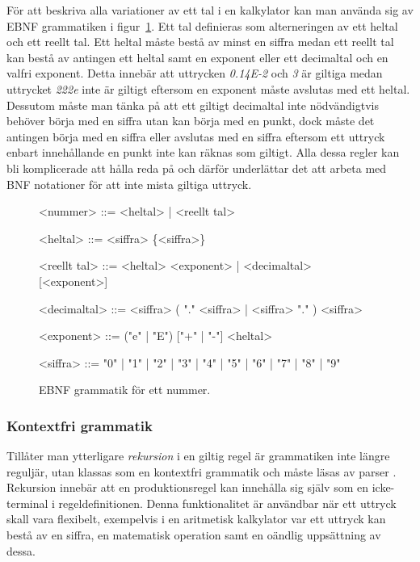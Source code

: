 För att beskriva alla variationer av ett tal i en kalkylator kan man
använda sig av EBNF grammatiken i figur~\ref{fig:reg}. Ett tal definieras som
alterneringen av ett heltal och ett reellt tal. Ett heltal måste bestå av
minst en siffra medan ett reellt tal kan bestå av antingen ett heltal samt en
exponent eller ett decimaltal och en valfri exponent. Detta innebär att
uttrycken \textit{0.14E-2} och \textit{3} är giltiga medan uttrycket
\textit{222e} inte är giltigt eftersom en exponent måste avslutas med ett
heltal. Dessutom måste man tänka på att ett giltigt decimaltal inte
nödvändigtvis behöver börja med en siffra utan kan börja med en punkt, dock
måste det antingen börja med en siffra eller avslutas med en siffra eftersom
ett uttryck enbart innehållande en punkt inte kan räknas som giltigt. Alla
dessa regler kan bli komplicerade att hålla reda på och därför underlättar det
att arbeta med BNF notationer för att inte mista giltiga uttryck.

\begin{figure}[ht]
  \begin{grammar}
    \singlespace\small%
    \selectfont

    <nummer> ::= <heltal> | <reellt tal>

    <heltal> ::= <siffra> \{<siffra>\}

    <reellt tal> ::= <heltal> <exponent> | <decimaltal> [<exponent>]

    <decimaltal> ::= { <siffra> } ( "." <siffra> | <siffra> "." ) { <siffra> }

    <exponent> ::= ("e" | "E") ["+" | "-"] <heltal>

    <siffra> ::= "0" | "1" | "2" | "3" | "4" | "5" | "6" | "7" | "8" | "9"

  \end{grammar}
  \caption{EBNF grammatik för ett nummer.}
  \label{fig:reg}
\end{figure}

\subsubsection{Kontextfri grammatik}

Tillåter man ytterligare \textit{rekursion} i en giltig regel är grammatiken
inte längre reguljär, utan klassas som en kontextfri grammatik och måste
läsas av parser \citep[s. 100]{sm09}. Rekursion innebär att en
produktionsregel kan innehålla sig själv som en icke-terminal i
regeldefinitionen. Denna funktionalitet är användbar när ett uttryck skall
vara flexibelt, exempelvis i en aritmetisk kalkylator var ett uttryck kan
bestå av en siffra, en matematisk operation samt en oändlig uppsättning av
dessa.


